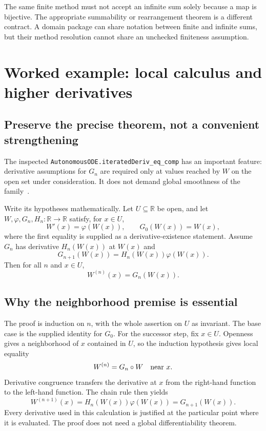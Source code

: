 \documentclass[11pt,letterpaper]{article}
\newcommand{\code}[1]{\nolinkurl{#1}}
\newcommand{\R}{\mathbb R}
\theoremstyle{definition}
\theoremstyle{remark}
\begin{document}
The same finite method must not accept an infinite sum solely because a map is
bijective. The appropriate summability or rearrangement theorem is a different
contract. A domain package can share notation between finite and infinite sums,
but their method resolution cannot share an unchecked finiteness assumption.

\section{Worked example: local calculus and higher derivatives}
\label{sec:calculus}

\subsection{Preserve the precise theorem, not a convenient strengthening}
The inspected \code{AutonomousODE.iteratedDeriv_eq_comp} has an important
feature: derivative assumptions for $G_n$ are required only at values reached by
$W$ on the open set under consideration. It does not demand global
smoothness of the family~\cite{p-ode}.

Write its hypotheses mathematically. Let $U\subseteq\R$ be open, and let
$W,\varphi,G_n,H_n:\R\to\R$ satisfy, for $x\in U$,
\[
 W'(x)=\varphi(W(x)),\qquad G_0(W(x))=W(x),
\]
where the first equality is supplied as a derivative-existence statement.
Assume $G_n$ has derivative $H_n(W(x))$ at $W(x)$ and
\[
 G_{n+1}(W(x))=H_n(W(x))\varphi(W(x)).
\]
Then for all $n$ and $x\in U$,
\begin{equation}
 W^{(n)}(x)=G_n(W(x)).
 \label{eq:autonomous}
\end{equation}

\subsection{Why the neighborhood premise is essential}
The proof is induction on $n$, with the whole assertion on $U$ as invariant.
The base case is the supplied identity for $G_0$. For the successor step, fix
$x\in U$. Openness gives a neighborhood of $x$ contained in $U$, so the induction
hypothesis gives local equality
\[
 W^{(n)}=G_n\circ W\quad\hbox{near }x.
\]
Derivative congruence transfers the derivative at $x$ from the right-hand
function to the left-hand function. The chain rule then yields
\[
 W^{(n+1)}(x)=H_n(W(x))\varphi(W(x))=G_{n+1}(W(x)).
\]
Every derivative used in this calculation is justified at the particular point
where it is evaluated. The proof does not need a global differentiability theorem.
\end{document}

